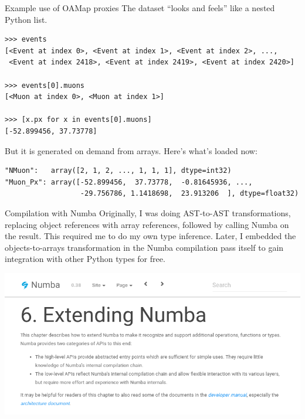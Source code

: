 \documentclass[aspectratio=169]{beamer}
\begin{document}
\begin{frame}[fragile]{Example use of OAMap proxies}
\vspace{0.5 cm}
\small
{\normalsize The dataset ``looks and feels'' like a nested Python list.}
\begin{verbatim}
>>> events
[<Event at index 0>, <Event at index 1>, <Event at index 2>, ...,
 <Event at index 2418>, <Event at index 2419>, <Event at index 2420>]

>>> events[0].muons
[<Muon at index 0>, <Muon at index 1>]

>>> [x.px for x in events[0].muons]
[-52.899456, 37.73778]
\end{verbatim}

\vspace{0.5 cm}
{\normalsize But it is generated on demand from arrays. Here's what's loaded now:}
\begin{verbatim}
"NMuon":   array([2, 1, 2, ..., 1, 1, 1], dtype=int32)
"Muon_Px": array([-52.899456,  37.73778,  -0.81645936, ...,
                  -29.756786, 1.1418698,  23.913206  ], dtype=float32)
\end{verbatim}
\end{frame}

\begin{frame}{Compilation with Numba}
\vspace{0.4 cm}
Originally, I was doing AST-to-AST transformations, replacing object references with array references, followed by calling Numba on the result. This required me to do my own type inference. Later, I embedded the objects-to-arrays transformation in the Numba compilation pass itself to gain integration with other Python types for free.

\begin{center}
\includegraphics[width=0.8\linewidth]{extending-numba.png}
\end{center}
\end{frame}
\end{document}
